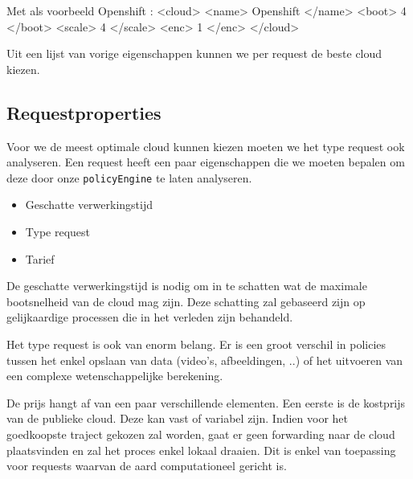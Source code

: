 Met als voorbeeld Openshift :
<cloud>
	<name> Openshift </name>
	<boot> 4 </boot>
	<scale> 4 </scale>
	<enc> 1 </enc>
</cloud>

Uit een lijst van vorige eigenschappen kunnen we per request de beste cloud kiezen.

\subsection{Requestproperties}

Voor we de meest optimale cloud kunnen kiezen moeten we het type request ook analyseren.
Een request heeft een paar eigenschappen die we moeten bepalen om deze door onze \texttt{policyEngine} te laten analyseren.
\begin{itemize}
	\item Geschatte verwerkingstijd
	\item Type request
	\item Tarief
\end{itemize}
De geschatte verwerkingstijd is nodig om in te schatten wat de maximale bootsnelheid van de cloud mag zijn.
Deze schatting zal gebaseerd zijn op gelijkaardige processen die in het verleden zijn behandeld.

Het type request is ook van enorm belang.
Er is een groot verschil in policies tussen het enkel opslaan van data (video's, afbeeldingen, ..) of het uitvoeren van een complexe wetenschappelijke berekening.

De prijs hangt af van een paar verschillende elementen.  Een eerste is de kostprijs van de publieke cloud.  Deze kan vast of variabel zijn.
Indien voor het goedkoopste traject gekozen zal worden, gaat er geen forwarding naar de cloud plaatsvinden en zal het proces enkel lokaal draaien.
Dit is enkel van toepassing voor requests waarvan de aard computationeel gericht is.







